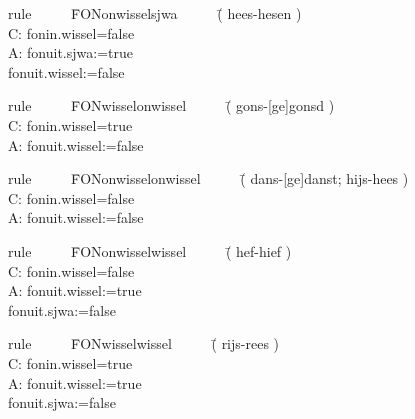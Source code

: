 \begin{tabbing}
rule \ \ \ \ \   \= FONonwisselsjwa   \ \ \ \ \   \= ( hees-hesen )           \\
C:   \> fonin.wissel=false    \>                          \\
A:   \> fonuit.sjwa:=true     \>                          \\
     \> fonuit.wissel:=false  \>                          \\
\end{tabbing}

\begin{tabbing}
rule \ \ \ \ \   \= FONwisselonwissel  \ \ \ \ \   \= ( gons-[ge]gonsd ) \\
C:   \> fonin.wissel=true     \>                          \\
A:   \> fonuit.wissel:=false  \>                          \\
\end{tabbing}

\begin{tabbing}
rule \ \ \ \ \  \= FONonwisselonwissel \ \ \ \ \  
\= ( dans-[ge]danst; hijs-hees ) \\
C:   \> fonin.wissel=false    \>                                 \\
A:   \> fonuit.wissel:=false  \>                                 \\
\end{tabbing}

\begin{tabbing}
rule \ \ \ \ \   \= FONonwisselwissel     \ \ \ \ \   \= ( hef-hief ) \\
C:   \> fonin.wissel=false    \>                          \\
A:   \> fonuit.wissel:=true   \>                          \\
     \> fonuit.sjwa:=false    \>                          \\
\end{tabbing}

\begin{tabbing}
rule \ \ \ \ \   \= FONwisselwissel \ \ \ \ \   \= ( rijs-rees )   \\
C:   \> fonin.wissel=true     \>                          \\
A:   \> fonuit.wissel:=true   \>                          \\
     \> fonuit.sjwa:=false    \>                          \\
\end{tabbing}

